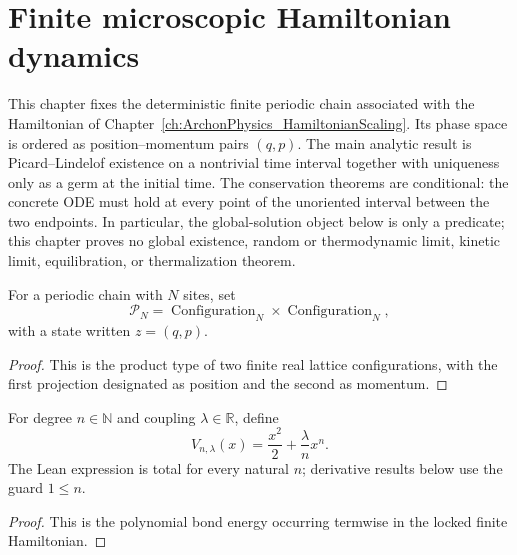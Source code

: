 
\chapter{Finite microscopic Hamiltonian dynamics}
\label{ch:ArchonPhysics_MicroscopicDynamics}

This chapter fixes the deterministic finite periodic chain associated with the
Hamiltonian of Chapter~\ref{ch:ArchonPhysics_HamiltonianScaling}.  Its phase
space is ordered as position--momentum pairs $(q,p)$.  The main analytic result
is Picard--Lindelof existence on a nontrivial time interval together with
uniqueness only as a germ at the initial time.  The conservation theorems are
conditional: the concrete ODE must hold at every point of the unoriented
interval between the two endpoints.  In particular, the global-solution object
below is only a predicate; this chapter proves no global existence, random or
thermodynamic limit, kinetic limit, equilibration, or thermalization theorem.

\begin{definition}
\label{def:microscopic:phase-space}
For a periodic chain with $N$ sites, set
\[
  \mathcal P_N=\operatorname{Configuration}_N\times
  \operatorname{Configuration}_N,
\]
with a state written $z=(q,p)$.
\end{definition}
\begin{proof}

\leanok
This is the product type of two finite real lattice configurations, with the
first projection designated as position and the second as momentum.
\end{proof}

\begin{definition}
\label{def:microscopic:interaction-potential}
For degree $n\in\mathbb N$ and coupling $\lambda\in\mathbb R$, define
\[
  V_{n,\lambda}(x)=\frac{x^2}{2}+\frac{\lambda}{n}x^n.
\]
The Lean expression is total for every natural $n$; derivative results below
use the guard $1\le n$.
\end{definition}
\begin{proof}

\leanok
This is the polynomial bond energy occurring termwise in the locked finite
Hamiltonian.
\end{proof}

